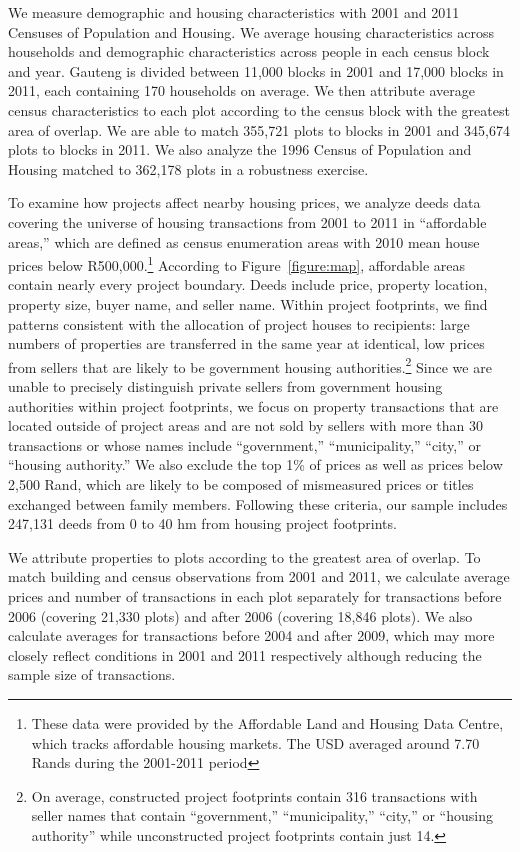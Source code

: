 \documentclass[12pt]{article}
\begin{document}
We measure demographic and housing characteristics with 2001 and 2011 Censuses of Population and Housing.  We average housing characteristics across households and demographic characteristics across people in each census block and year.  Gauteng is divided between 11,000 blocks in 2001 and 17,000 blocks in 2011, each containing 170 households on average.  We then attribute average census characteristics to each plot according to the census block with the greatest area of overlap.  We are able to match 355,721 plots to blocks in 2001 and 345,674 plots to blocks in 2011.  We also analyze the 1996 Census of Population and Housing matched to 362,178 plots in a robustness exercise.

To examine how projects affect nearby housing prices, we analyze deeds data covering the universe of housing transactions from 2001 to 2011 in ``affordable areas,'' which are defined as census enumeration areas with 2010 mean house prices below R500,000.\footnote{These data were provided by the Affordable Land and Housing Data Centre, which tracks affordable housing markets.  The USD averaged around 7.70 Rands during the 2001-2011 period}  According to Figure~\ref{figure:map}, affordable areas contain nearly every project boundary.  Deeds include price, property location, property size, buyer name, and seller name.  Within project footprints, we find patterns consistent with the allocation of project houses to recipients: large numbers of properties are transferred in the same year at identical, low prices from sellers that are likely to be government housing authorities.\footnote{On average, constructed project footprints contain 316 transactions with seller names that contain ``government,'' ``municipality,'' ``city,'' or ``housing authority'' while unconstructed project footprints contain just 14.}  Since we are unable to precisely distinguish private sellers from government housing authorities within project footprints, we focus on property transactions that are located outside of project areas and are not sold by sellers with more than 30 transactions or whose names include ``government,'' ``municipality,'' ``city,'' or ``housing authority.''  We also exclude the top 1\% of prices as well as prices below 2,500 Rand, which are likely to be composed of mismeasured prices or titles exchanged between family members.  Following these criteria, our sample includes 247,131 deeds from 0 to 40 hm from housing project footprints.  

We attribute properties to plots according to the greatest area of overlap.  To match building and census observations from 2001 and 2011, we calculate average prices and number of transactions in each plot separately for transactions before 2006 (covering 21,330 plots) and after 2006 (covering 18,846 plots).  We also calculate averages for transactions before 2004 and after 2009, which may more closely reflect conditions in 2001 and 2011 respectively although reducing the sample size of transactions.
\end{document}
